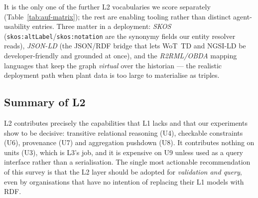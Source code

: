 It is the only one of the further L2 vocabularies we score separately
(Table~\ref{tab:auf-matrix}); the rest are enabling tooling rather than distinct
agent-usability entries. Three matter in a deployment: \emph{SKOS}
(\texttt{skos:altLabel}/\texttt{skos:notation} are the synonymy fields our entity
resolver reads), \emph{JSON-LD} (the JSON/RDF bridge that lets WoT~TD and NGSI-LD
be developer-friendly and grounded at once), and the \emph{R2RML/OBDA} mapping
languages that keep the graph \emph{virtual} over the historian --- the realistic
deployment path when plant data is too large to materialise as triples.

\subsection{Summary of L2}

L2 contributes precisely the capabilities that L1 lacks and that our experiments
show to be decisive: transitive relational reasoning (U4), checkable constraints
(U6), provenance (U7) and aggregation pushdown (U8). It contributes nothing on
units (U3), which is L3's job, and it is expensive on U9 unless used as a
query interface rather than a serialisation. The single most actionable
recommendation of this survey is that the L2 layer should be adopted for
\emph{validation and query}, even by organisations that have no intention of
replacing their L1 models with RDF.
